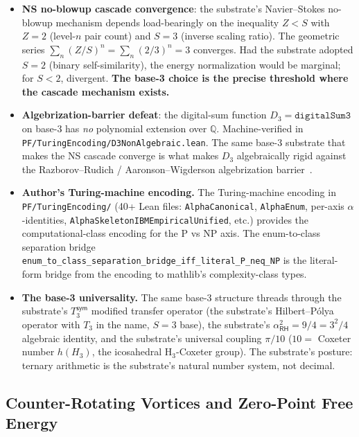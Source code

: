 \documentclass[11pt,a4paper]{amsart}
\theoremstyle{plain}
\theoremstyle{definition}
\begin{document}
\begin{itemize}[itemsep=2pt,leftmargin=2em]
\item \textbf{NS no-blowup cascade convergence}: the substrate's Navier--Stokes no-blowup mechanism depends load-bearingly on the inequality $Z < S$ with $Z = 2$ (level-$n$ pair count) and $S = 3$ (inverse scaling ratio). The geometric series $\sum_n (Z/S)^n = \sum_n (2/3)^n = 3$ converges. Had the substrate adopted $S = 2$ (binary self-similarity), the energy normalization would be marginal; for $S < 2$, divergent. \textbf{The base-3 choice is the precise threshold where the cascade mechanism exists.}
\item \textbf{Algebrization-barrier defeat}: the digital-sum function $D_3 = \texttt{digitalSum3}$ on base-3 has \emph{no} polynomial extension over $\mathbb{Q}$. Machine-verified in \texttt{PF/TuringEncoding/D3NonAlgebraic.lean}. The same base-3 substrate that makes the NS cascade converge is what makes $D_3$ algebraically rigid against the Razborov--Rudich / Aaronson--Wigderson algebrization barrier~\cite{aaronson-wigderson2009}.
\item \textbf{Author's Turing-machine encoding.} The Turing-machine encoding in \texttt{PF/TuringEncoding/} (40+ Lean files: \texttt{AlphaCanonical}, \texttt{AlphaEnum}, per-axis $\alpha$-identities, \texttt{AlphaSkeletonIBMEmpiricalUnified}, etc.) provides the computational-class encoding for the P vs NP axis. The enum-to-class separation bridge \texttt{enum\_to\_class\_separation\_bridge\_iff\_literal\_P\_neq\_NP} is the literal-form bridge from the encoding to mathlib's complexity-class types.
\item \textbf{The base-3 universality.} The same base-3 structure threads through the substrate's $T_3^{\textsf{sym}}$ modified transfer operator (the substrate's Hilbert--P\'olya operator with $T_3$ in the name, $S = 3$ base), the substrate's $\alpha_{\textsf{RH}}^2 = 9/4 = 3^2/4$ algebraic identity, and the substrate's universal coupling $\pi/10$ ($10 = $ Coxeter number $h(H_3)$, the icosahedral H${}_3$-Coxeter group). The substrate's posture: ternary arithmetic is the substrate's natural number system, not decimal.
\end{itemize}

\subsection{Counter-Rotating Vortices and Zero-Point Free Energy}\label{subsec:counter-rotating}
\end{document}
